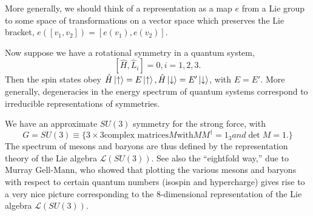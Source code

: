 More generally, we should think of a representation as a map $e$ from a Lie group to some space of transformations on a vector space which preserves the Lie bracket, $e([v_1,v_2])=[e(v_1),e(v_2)]$.

Now suppose we have a rotational symmetry in a quantum system, $$[\hat H, \hat L_i]=0,i=1,2,3.$$ Then the spin states obey $\hat H\left| \uparrow \right>=E\left| \uparrow \right>, \hat H\left| \downarrow \right>= E' \left| \downarrow \right>$, with $E=E'$. More generally, degeneracies in the energy spectrum of quantum systems correspond to irreducible representations of symmetries.

\begin{exm}
We have an approximate $SU(3)$ symmetry for the strong force, with
$$G=SU(3)\equiv \{3\times 3 \text{complex matrices} M \text{with} M M^\dagger = 1_3 and \det M = 1.\}$$
The spectrum of mesons and baryons are thus defined by the representation theory of the Lie algebra $\mathcal{L}(SU(3))$. See also the ``eightfold way,'' due to Murray Gell-Mann, who showed that plotting the various mesons and baryons with respect to certain quantum numbers (isospin and hypercharge) gives rise to a very nice picture corresponding to the 8-dimensional representation of the Lie algebra $\mathcal{L}(SU(3)).$ %
\end{exm}